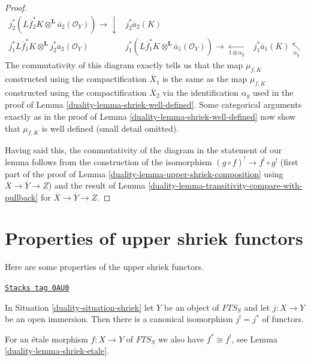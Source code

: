 \begin{proof}
$$
\begin{array}{ccc}j_2^*\left(L\overline{f}_2^*K \otimes^\mathbf{L}
\overline{a}_2(\mathcal{O}_Y)\right) \longrightarrow\downarrow & j_2^*\overline{a}_2(K) &  \\ j_1^*L\overline{f}_1^*K \otimes^\mathbf{L} j_2^*\overline{a}_2(\mathcal{O}_Y) & j_1^*(L\overline{f}_1^*K \otimes^\mathbf{L} \overline{a}_1(\mathcal{O}_Y))
\longrightarrow\underset{1 \otimes \alpha_g}{\longleftarrow} & j_1^* \overline{a}_1(K) \underset{\alpha_g}{\nwarrow}\end{array}
$$
The commutativity of this diagram exactly tells us that the map
$\mu_{f, K}$ constructed using the compactification $\overline{X}_1$
is the same as the map $\mu_{f, K}$ constructed using the compactification
$\overline{X}_2$ via the identification $\alpha_g$ used in the proof
of Lemma \ref{duality-lemma-shriek-well-defined}. Some categorical arguments
exactly as in the proof of  Lemma \ref{duality-lemma-shriek-well-defined}
now show that $\mu_{f, K}$ is well defined (small detail omitted).

\medskip\noindent
Having said this, the commutativity of the diagram in the statement
of our lemma follows from the construction of the isomorphism
$(g \circ f)^! \to f^! \circ g^!$ (first part of the proof of
Lemma \ref{duality-lemma-upper-shriek-composition} using
$\overline{X} \to \overline{Y} \to Z$) and the result
of Lemma \ref{duality-lemma-transitivity-compare-with-pullback}
for $\overline{X} \to \overline{Y} \to Z$.
\end{proof}

\section{Properties of upper shriek functors}
\label{duality-section-upper-shriek-properties}
Here are some properties of the upper shriek functors.

\begin{lemma}
\label{duality-lemma-shriek-open-immersion}
\href{https://stacks.math.columbia.edu/tag/0AU0}{\texttt{Stacks tag 0AU0}}

In Situation \ref{duality-situation-shriek} let $Y$ be an object
of $\textit{FTS}_S$ and let $j : X \to Y$ be an open immersion.
Then there is a canonical isomorphism $j^! = j^*$ of functors.
\end{lemma}

For an \'etale morphism $f : X \to Y$ of $\textit{FTS}_S$
we also have $f^* \cong f^!$, see Lemma \ref{duality-lemma-shriek-etale}.

